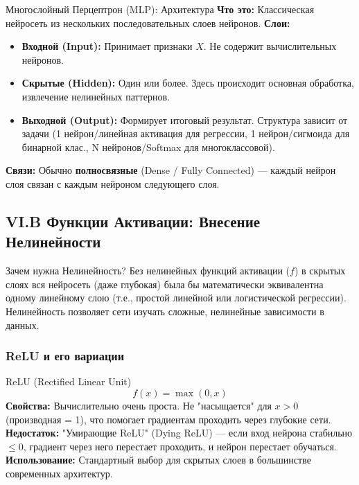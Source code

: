 \begin{myblock}{Многослойный Перцептрон (MLP): Архитектура}
    \textbf{Что это:} Классическая нейросеть из нескольких последовательных слоев нейронов.
    \textbf{Слои:}
    \begin{itemize}[nosep, leftmargin=*]
        \item \textbf{Входной (Input):} Принимает признаки $X$. Не содержит вычислительных нейронов.
        \item \textbf{Скрытые (Hidden):} Один или более. Здесь происходит основная обработка, извлечение нелинейных паттернов.
        \item \textbf{Выходной (Output):} Формирует итоговый результат. Структура зависит от задачи (1 нейрон/линейная активация для регрессии, 1 нейрон/сигмоида для бинарной клас., N нейронов/Softmax для многоклассовой).
    \end{itemize}
    \textbf{Связи:} Обычно \textbf{полносвязные} (Dense / Fully Connected) — каждый нейрон слоя связан с каждым нейроном следующего слоя.
\end{myblock}

\subsection{VI.B Функции Активации: Внесение Нелинейности}

\begin{alerttextbox}{Зачем нужна Нелинейность?}
    Без нелинейных функций активации ($f$) в скрытых слоях вся нейросеть (даже глубокая) была бы математически эквивалентна одному линейному слою (т.е., простой линейной или логистической регрессии). Нелинейность позволяет сети изучать сложные, нелинейные зависимости в данных.
\end{alerttextbox}

\subsubsection{ReLU и его вариации}
\begin{myexampleblock}{ReLU (Rectified Linear Unit)}
    \[ f(x) = \max(0, x) \]
    \textbf{Свойства:} Вычислительно очень проста. Не "насыщается" для $x>0$ (производная = 1), что помогает градиентам проходить через глубокие сети.
    \textbf{Недостаток:} "Умирающие ReLU" (Dying ReLU) — если вход нейрона стабильно $ \le 0$, градиент через него перестает проходить, и нейрон перестает обучаться.
    \textbf{Использование:} Стандартный выбор для скрытых слоев в большинстве современных архитектур.
\end{myexampleblock}

